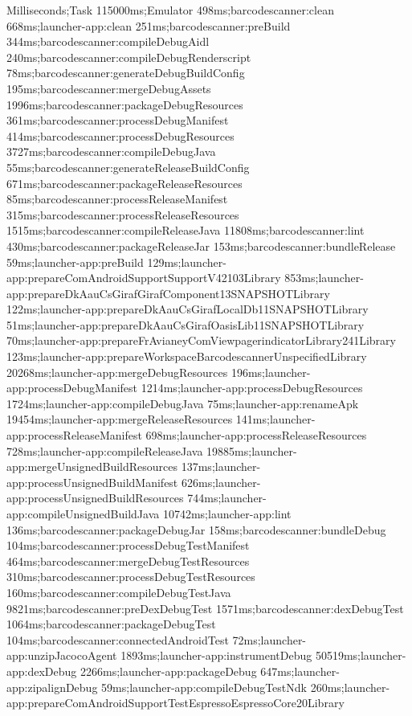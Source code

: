 \begin{gradlecode}[caption=Running time of tasks of new dependency system with full targets,label=lst:full_data_new_dep_system_2]
Milliseconds;Task
115000ms;Emulator
498ms;barcodescanner:clean
668ms;launcher-app:clean
251ms;barcodescanner:preBuild
344ms;barcodescanner:compileDebugAidl
240ms;barcodescanner:compileDebugRenderscript
78ms;barcodescanner:generateDebugBuildConfig
195ms;barcodescanner:mergeDebugAssets
1996ms;barcodescanner:packageDebugResources
361ms;barcodescanner:processDebugManifest
414ms;barcodescanner:processDebugResources
3727ms;barcodescanner:compileDebugJava
55ms;barcodescanner:generateReleaseBuildConfig
671ms;barcodescanner:packageReleaseResources
85ms;barcodescanner:processReleaseManifest
315ms;barcodescanner:processReleaseResources
1515ms;barcodescanner:compileReleaseJava
11808ms;barcodescanner:lint
430ms;barcodescanner:packageReleaseJar
153ms;barcodescanner:bundleRelease
59ms;launcher-app:preBuild
129ms;launcher-app:prepareComAndroidSupportSupportV42103Library
853ms;launcher-app:prepareDkAauCsGirafGirafComponent13SNAPSHOTLibrary
122ms;launcher-app:prepareDkAauCsGirafLocalDb11SNAPSHOTLibrary
51ms;launcher-app:prepareDkAauCsGirafOasisLib11SNAPSHOTLibrary
70ms;launcher-app:prepareFrAvianeyComViewpagerindicatorLibrary241Library
123ms;launcher-app:prepareWorkspaceBarcodescannerUnspecifiedLibrary
20268ms;launcher-app:mergeDebugResources
196ms;launcher-app:processDebugManifest
1214ms;launcher-app:processDebugResources
1724ms;launcher-app:compileDebugJava
75ms;launcher-app:renameApk
19454ms;launcher-app:mergeReleaseResources
141ms;launcher-app:processReleaseManifest
698ms;launcher-app:processReleaseResources
728ms;launcher-app:compileReleaseJava
19885ms;launcher-app:mergeUnsignedBuildResources
137ms;launcher-app:processUnsignedBuildManifest
626ms;launcher-app:processUnsignedBuildResources
744ms;launcher-app:compileUnsignedBuildJava
10742ms;launcher-app:lint
136ms;barcodescanner:packageDebugJar
158ms;barcodescanner:bundleDebug
104ms;barcodescanner:processDebugTestManifest
464ms;barcodescanner:mergeDebugTestResources
310ms;barcodescanner:processDebugTestResources
160ms;barcodescanner:compileDebugTestJava
9821ms;barcodescanner:preDexDebugTest
1571ms;barcodescanner:dexDebugTest
1064ms;barcodescanner:packageDebugTest
104ms;barcodescanner:connectedAndroidTest
72ms;launcher-app:unzipJacocoAgent
1893ms;launcher-app:instrumentDebug
50519ms;launcher-app:dexDebug
2266ms;launcher-app:packageDebug
647ms;launcher-app:zipalignDebug
59ms;launcher-app:compileDebugTestNdk
260ms;launcher-app:prepareComAndroidSupportTestEspressoEspressoCore20Library

\end{gradlecode}
